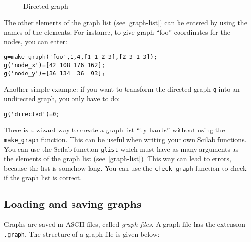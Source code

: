 \documentclass[11pt]{article}
\newcommand{\func}[1]{\texttt{#1}}
\begin{document}
\begin{figure}
 \begin{center}\end{center}
 \caption{Directed graph}
 \label{fig-foo1}
\end{figure}

The other elements of the graph list (see \ref{graph-list}) can be
entered by using the names of the elements. For instance, to give graph
``foo'' coordinates for the nodes, you can enter:
\begin{verbatim}
g=make_graph('foo',1,4,[1 1 2 3],[2 3 1 3]);
g('node_x')=[42 108 176 162];
g('node_y')=[36 134  36  93];
\end{verbatim}

Another simple example: if you want to transform the directed graph \texttt{g}
into
an undirected graph, you only have to do:
\begin{verbatim}
g('directed')=0;
\end{verbatim}

There is a wizard way to create a graph list ``by hands''
without using the 
\func{make\_graph} function. This can be useful when writing your
own Scilab functions.
You can use the Scilab function
\func{glist} which must have as many arguments as the elements of
the graph list (see~\ref{graph-list}).
This way can lead
to errors, because the list is somehow long. You can use the 
\func{check\_graph}
function to check if the graph list is correct.

\subsection{Loading and saving graphs}\label{loading}

Graphs are saved in ASCII files, called \emph{graph files}. 
A graph file has the extension \texttt{.graph}. The
structure of a graph file is given below:
\end{document}

